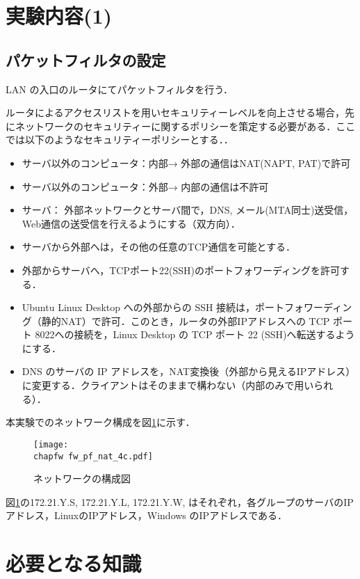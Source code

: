 \clearpage

\section{実験内容(1)}

\subsection*{パケットフィルタの設定}

LAN の入口のルータにてパケットフィルタを行う．

ルータによるアクセスリストを用いセキュリティーレベルを向上させる場合，先にネットワークのセキュリティーに関するポリシーを策定する必要がある．ここでは以下のようなセキュリティーポリシーとする．．

\begin{itemize}
 \item サーバ以外のコンピュータ：内部→ 外部の通信はNAT(NAPT, PAT)で許可
 \item サーバ以外のコンピュータ：外部→ 内部の通信は不許可
 \item サーバ： 外部ネットワークとサーバ間で，DNS, メール(MTA同士)送受信，Web通信の送受信を行えるようにする（双方向）．
 \item サーバから外部へは，その他の任意のTCP通信を可能とする．
 \item 外部からサーバへ，TCPポート22(SSH)のポートフォワーディングを許可する．
 \item Ubuntu Linux Desktop への外部からの SSH 接続は，ポートフォワーディング（静的NAT）で許可．このとき，ルータの外部IPアドレスへの TCP ポート 8022への接続を，Linux Desktop の TCP ポート 22 (SSH)へ転送するようにする． 
 \item DNS のサーバの IP アドレスを，NAT変換後（外部から見えるIPアドレス）に変更する．クライアントはそのままで構わない（内部のみで用いられる）．
\end{itemize}
本実験でのネットワーク構成を図\ref{fig:06:packet-filter}に示す．
\begin{figure}
  \centering
  \texttt{[image: \\chapfw fw\_pf\_nat\_4c.pdf]}
  \caption{ネットワークの構成図}
  \label{fig:06:packet-filter}
\end{figure}
図\ref{fig:06:packet-filter}の172.21.Y.S, 172.21.Y.L, 172.21.Y.W, はそれぞれ，各グループのサーバのIPアドレス，LinuxのIPアドレス，Windows のIPアドレスである．

\section{必要となる知識}

